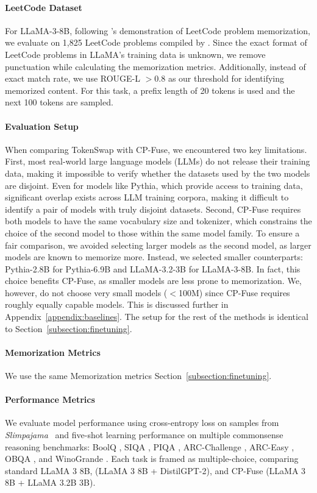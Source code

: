 \paragraph{LeetCode Dataset} For LLaMA-3-8B, following \citet{karamolegkou2023copyright}'s demonstration of LeetCode problem memorization, we evaluate on 1,825 LeetCode problems compiled by \citet{gzipchrist2021leetcode}. Since the exact format of LeetCode problems in LLaMA's training data is unknown, we remove punctuation while calculating the memorization metrics. Additionally, instead of exact match rate, we use ROUGE-L \(> 0.8\)  as our threshold for identifying memorized content. For this task, a prefix length of 20 tokens is used and the next 100 tokens are sampled.

\paragraph{Evaluation Setup} When comparing TokenSwap with CP-Fuse, we encountered two key limitations. First, most real-world large language models (LLMs) do not release their training data, making it impossible to verify whether the datasets used by the two models are disjoint. Even for models like Pythia, which provide access to training data, significant overlap exists across LLM training corpora, making it difficult to identify a pair of models with truly disjoint datasets. Second, CP-Fuse requires both models to have the same vocabulary size and tokenizer, which constrains the choice of the second model to those within the same model family. To ensure a fair comparison, we avoided selecting larger models as the second model, as larger models are known to memorize more. Instead, we selected smaller counterparts: Pythia-2.8B for Pythia-6.9B and LLaMA-3.2-3B for LLaMA-3-8B. In fact, this choice benefits CP-Fuse, as smaller models are less prone to memorization. We, however, do not choose very small models (\(<\)100M) since CP-Fuse requires roughly equally capable models. This is discussed further in Appendix~\ref{appendix:baselines}. The setup for the rest of the methods is identical to Section~\ref{subsection:finetuning}.

\paragraph{Memorization Metrics} We use the same Memorization metrics Section~\ref{subsection:finetuning}.

\paragraph{Performance Metrics} We evaluate model performance using cross-entropy loss on samples from \textit{Slimpajama}~\citep{soboleva2023slimpajama} and five-shot learning performance on multiple commonsense reasoning benchmarks: BoolQ \citep{clark2019boolq}, SIQA \citep{sap2019socialiqa}, PIQA \citep{bisk2020piqa}, ARC-Challenge \citep{clark2018think}, ARC-Easy \citep{clark2018think}, OBQA \citep{mihaylov2018can}, and WinoGrande \citep{sakaguchi2021winogrande}. Each task is framed as multiple-choice, comparing standard LLaMA 3 8B, \sys (LLaMA 3 8B + DistilGPT-2), and CP-Fuse (LLaMA 3 8B + LLaMA 3.2B 3B).

